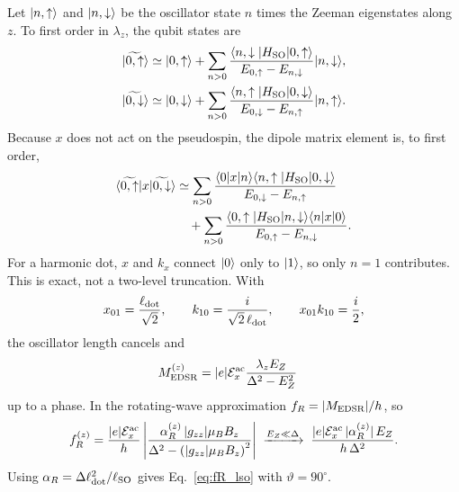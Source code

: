\documentclass[
  aps,
  reprint,
  amsmath,
  amssymb,
  groupedaddress,
  floatfix,
  longbibliography,
]{revtex4-2}
\newcommand{\Eac}{\mathcal{E}^{\rm ac}_x}
\newcommand{\ldot}{\ell_{\rm dot}}
\newcommand{\lso}{\ell_{\rm SO}}
\begin{document}
Let $\ket{n,\uparrow}$ and $\ket{n,\downarrow}$ be the oscillator state $n$ times the Zeeman eigenstates along $z$. To first order in $\lambda_z$, the qubit states are
\begin{align}
|\widetilde{0,\uparrow}\rangle
&\simeq
|0,\uparrow\rangle
+
\sum_{n>0}
\frac{
\langle n,\downarrow|H_{\rm SO}|0,\uparrow\rangle
}{
E_{0,\uparrow}-E_{n,\downarrow}
}
|n,\downarrow\rangle,
\\
|\widetilde{0,\downarrow}\rangle
&\simeq
|0,\downarrow\rangle
+
\sum_{n>0}
\frac{
\langle n,\uparrow|H_{\rm SO}|0,\downarrow\rangle
}{
E_{0,\downarrow}-E_{n,\uparrow}
}
|n,\uparrow\rangle .
\end{align}
Because $x$ does not act on the pseudospin, the dipole matrix element is, to first order,
\begin{align}
\langle \widetilde{0,\uparrow}|x|\widetilde{0,\downarrow}\rangle
&\simeq
\sum_{n>0}
\frac{
\langle 0|x|n\rangle
\langle n,\uparrow|H_{\rm SO}|0,\downarrow\rangle
}{
E_{0,\downarrow}-E_{n,\uparrow}
}
\nonumber\\
&\quad+
\sum_{n>0}
\frac{
\langle 0,\uparrow|H_{\rm SO}|n,\downarrow\rangle
\langle n|x|0\rangle
}{
E_{0,\uparrow}-E_{n,\downarrow}
}.
\end{align}
For a harmonic dot, $x$ and $k_x$ connect $\ket{0}$ only to $\ket{1}$, so only $n=1$ contributes. This is exact, not a two-level truncation. With
\begin{align}
x_{01}
=
\frac{\ldot}{\sqrt{2}},
\qquad
k_{10}
=
\frac{i}{\sqrt{2}\,\ldot},
\qquad
x_{01}k_{10}
=
\frac{i}{2},
\end{align}
the oscillator length cancels and
\begin{align}
M_{\rm EDSR}^{(z)}
&=
|e|\Eac
\frac{
\lambda_z E_Z
}{
\Delta^2-E_Z^2
}
\label{eq:MEDSR_z}
\end{align}
up to a phase. In the rotating-wave approximation $f_R=|M_{\rm EDSR}|/h$, so
\begin{equation}
f_R^{(z)}
=
\frac{|e|\Eac}{h}
\left|
\frac{
\alpha_R^{(z)}\,|g_{zz}|\mu_B B_z
}{
\Delta^2
-
\left(|g_{zz}|\mu_B B_z\right)^2
}
\right|
\;\xrightarrow{E_Z\ll\Delta}\;
\frac{|e|\Eac\,|\alpha_R^{(z)}|\,E_Z}{h\,\Delta^2}.
\label{eq:fR_z}
\end{equation}
Using $\alpha_R=\Delta\ldot^2/\lso$ gives Eq.~\eqref{eq:fR_lso} with $\vartheta=90^\circ$.
\end{document}
